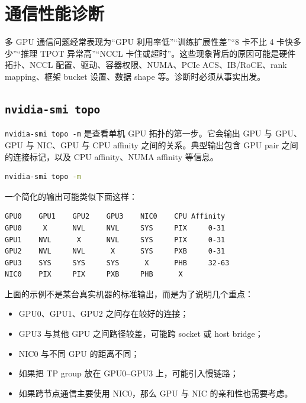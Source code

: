 \section{通信性能诊断}
\label{sec:communication-diagnosis}

多 GPU 通信问题经常表现为“GPU 利用率低”“训练扩展性差”“8 卡不比 4 卡快多少”“推理 TPOT 异常高”“NCCL 卡住或超时”。这些现象背后的原因可能是硬件拓扑、NCCL 配置、驱动、容器权限、NUMA、PCIe ACS、IB/RoCE、rank mapping、框架 bucket 设置、数据 shape 等。诊断时必须从事实出发。

\subsection{\texttt{nvidia-smi topo}}
\label{subsec:nvidia-smi-topo}

\texttt{nvidia-smi topo -m} 是查看单机 GPU 拓扑的第一步。它会输出 GPU 与 GPU、GPU 与 NIC、GPU 与 CPU affinity 之间的关系。典型输出包含 GPU pair 之间的连接标记，以及 CPU affinity、NUMA affinity 等信息。

\begin{lstlisting}[language=bash,caption={查看单机 GPU 拓扑},label={lst:nvidia-smi-topo}]
nvidia-smi topo -m
\end{lstlisting}

一个简化的输出可能类似下面这样：

\begin{lstlisting}[language=bash,caption={nvidia-smi topo -m 的简化示意输出},label={lst:nvidia-smi-topo-output}]
        GPU0    GPU1    GPU2    GPU3    NIC0    CPU Affinity
GPU0     X      NVL     NVL     SYS     PIX     0-31
GPU1    NVL      X      NVL     SYS     PIX     0-31
GPU2    NVL     NVL      X      SYS     PXB     0-31
GPU3    SYS     SYS     SYS      X      PHB     32-63
NIC0    PIX     PIX     PXB     PHB      X
\end{lstlisting}

上面的示例不是某台真实机器的标准输出，而是为了说明几个重点：

\begin{itemize}
  \item GPU0、GPU1、GPU2 之间存在较好的连接；
  \item GPU3 与其他 GPU 之间路径较差，可能跨 socket 或 host bridge；
  \item NIC0 与不同 GPU 的距离不同；
  \item 如果把 TP group 放在 GPU0--GPU3 上，可能引入慢链路；
  \item 如果跨节点通信主要使用 NIC0，那么 GPU 与 NIC 的亲和性也需要考虑。
\end{itemize}

